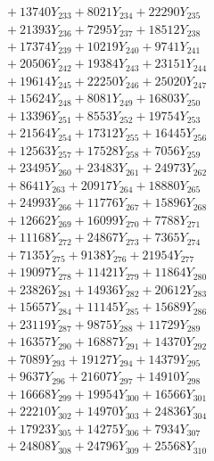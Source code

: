 \documentclass[a4paper,10pt]{article}
\begin{document}
{\begin{align}
&\;  + 13740 Y_{233} + 8021 Y_{234} + 22290 Y_{235} \\[0.3ex]
&\;  + 21393 Y_{236} + 7295 Y_{237} + 18512 Y_{238} \\[0.5ex]\allowbreak
&\;  + 17374 Y_{239} + 10219 Y_{240} + 9741 Y_{241} \\[0.3ex]
&\;  + 20506 Y_{242} + 19384 Y_{243} + 23151 Y_{244} \\[0.3ex]
&\;  + 19614 Y_{245} + 22250 Y_{246} + 25020 Y_{247} \\[0.3ex]
&\;  + 15624 Y_{248} + 8081 Y_{249} + 16803 Y_{250} \\[0.3ex]
&\;  + 13396 Y_{251} + 8553 Y_{252} + 19754 Y_{253} \\[0.3ex]
&\;  + 21564 Y_{254} + 17312 Y_{255} + 16445 Y_{256} \\[0.3ex]
&\;  + 12563 Y_{257} + 17528 Y_{258} + 7056 Y_{259} \\[0.3ex]
&\;  + 23495 Y_{260} + 23483 Y_{261} + 24973 Y_{262} \\[0.3ex]
&\;  + 8641 Y_{263} + 20917 Y_{264} + 18880 Y_{265} \\[0.3ex]
&\;  + 24993 Y_{266} + 11776 Y_{267} + 15896 Y_{268} \\[0.5ex]\allowbreak
&\;  + 12662 Y_{269} + 16099 Y_{270} + 7788 Y_{271} \\[0.3ex]
&\;  + 11168 Y_{272} + 24867 Y_{273} + 7365 Y_{274} \\[0.3ex]
&\;  + 7135 Y_{275} + 9138 Y_{276} + 21954 Y_{277} \\[0.3ex]
&\;  + 19097 Y_{278} + 11421 Y_{279} + 11864 Y_{280} \\[0.3ex]
&\;  + 23826 Y_{281} + 14936 Y_{282} + 20612 Y_{283} \\[0.3ex]
&\;  + 15657 Y_{284} + 11145 Y_{285} + 15689 Y_{286} \\[0.3ex]
&\;  + 23119 Y_{287} + 9875 Y_{288} + 11729 Y_{289} \\[0.3ex]
&\;  + 16357 Y_{290} + 16887 Y_{291} + 14370 Y_{292} \\[0.3ex]
&\;  + 7089 Y_{293} + 19127 Y_{294} + 14379 Y_{295} \\[0.3ex]
&\;  + 9637 Y_{296} + 21607 Y_{297} + 14910 Y_{298} \\[0.5ex]\allowbreak
&\;  + 16668 Y_{299} + 19954 Y_{300} + 16566 Y_{301} \\[0.3ex]
&\;  + 22210 Y_{302} + 14970 Y_{303} + 24836 Y_{304} \\[0.3ex]
&\;  + 17923 Y_{305} + 14275 Y_{306} + 7934 Y_{307} \\[0.3ex]
&\;  + 24808 Y_{308} + 24796 Y_{309} + 25568 Y_{310} \\[0.3ex]

\end{align}}
\end{document}
